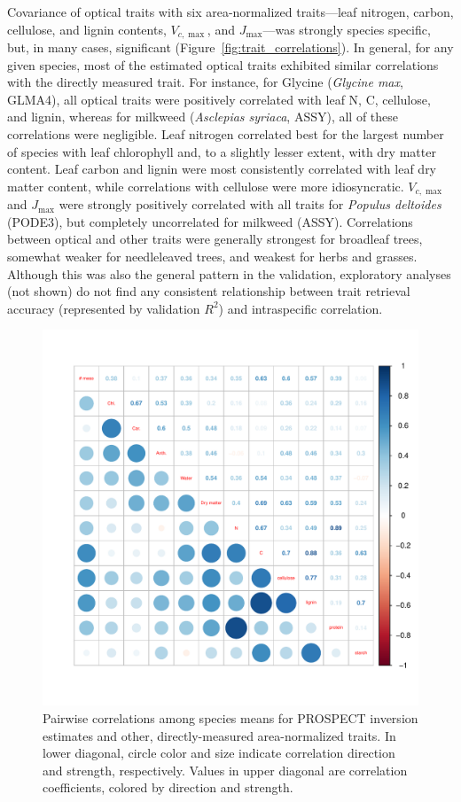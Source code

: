 Covariance of optical traits with six area-normalized traits---leaf nitrogen, carbon, cellulose, and lignin contents, $V_{c,\max}$, and $J_{\max}$---was strongly species specific, but, in many cases, significant (Figure~\ref{fig:trait_correlations}).
In general, for any given species, most of the estimated optical traits exhibited similar correlations with the directly measured trait.
For instance, for Glycine (\textit{Glycine max}, GLMA4), all optical traits were positively correlated with leaf N, C, cellulose, and lignin, whereas for milkweed (\textit{Asclepias syriaca}, ASSY), all of these correlations were negligible.
Leaf nitrogen correlated best for the largest number of species with leaf chlorophyll and, to a slightly lesser extent, with dry matter content.
Leaf carbon and lignin were most consistently correlated with leaf dry matter content, while correlations with cellulose were more idiosyncratic.
$V_{c,\max}$ and $J_{\max}$ were strongly positively correlated with all traits for \textit{Populus deltoides} (PODE3), but completely uncorrelated for milkweed (ASSY).
Correlations between optical and other traits were generally strongest for broadleaf trees, somewhat weaker for needleleaved trees, and weakest for herbs and grasses.
Although this was also the general pattern in the validation, exploratory analyses (not shown) do not find any consistent relationship between trait retrieval accuracy (represented by validation $R^2$) and intraspecific correlation.

\begin{figure}
  \centering
  \includegraphics[width=\textwidth]{3_prospect/figures/trait_correlations_species.pdf}
  \caption{%
    Pairwise correlations among species means for PROSPECT inversion estimates and other, directly-measured area-normalized traits.
    In lower diagonal, circle color and size indicate correlation direction and strength, respectively.
    Values in upper diagonal are correlation coefficients, colored by direction and strength.
  }\label{fig:trait_correlations_species}
\end{figure}

